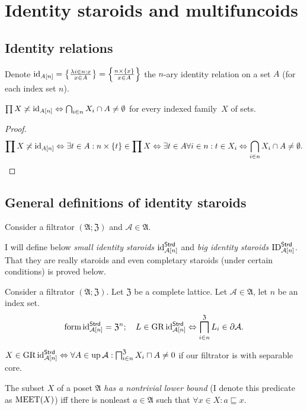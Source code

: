 \section{Identity staroids and multifuncoids}


\subsection{Identity relations}

Denote $\operatorname{id}_{A[n]}=\left\{ \frac{\lambda i\in n:x}{x\in A}\right\}=\left\{ \frac{n\times\{x\}}{x\in A}\right\}$
the $n$-ary identity relation on a set $A$ (for each index set $n$).
\begin{prop}
$\prod X\not\asymp\operatorname{id}_{A[n]}\Leftrightarrow\bigcap_{i\in n}X_{i}\cap A\neq\emptyset$
for every indexed family~$X$ of sets.\end{prop}
\begin{proof}
~
\[
\prod X\not\asymp\operatorname{id}_{A[n]}\Leftrightarrow\exists t\in A:n\times\{t\}\in\prod X\Leftrightarrow\exists t\in A\forall i\in n:t\in X_{i}\Leftrightarrow\bigcap_{i\in n}X_{i}\cap A\neq\emptyset.
\]

\end{proof}

\subsection{General definitions of identity staroids}

Consider a filtrator $(\mathfrak{A};\mathfrak{Z})$ and $\mathcal{A}\in\mathfrak{A}$.

I will define below \emph{small identity staroids} $\operatorname{id}_{\mathcal{A}[n]}^{\mathsf{Strd}}$
and \emph{big identity staroids} $\operatorname{ID}_{\mathcal{A}[n]}^{\mathsf{Strd}}$.
That they are really staroids and even completary staroids (under
certain conditions) is proved below.
\begin{defn}
Consider a filtrator $(\mathfrak{A};\mathfrak{Z})$.
Let $\mathfrak{Z}$ be a complete lattice. Let $\mathcal{A}\in\mathfrak{A}$,
let $n$ be an index set.
\[
\operatorname{form}\operatorname{id}_{\mathcal{A}[n]}^{\mathsf{Strd}}=\mathfrak{Z}^{n};\quad L\in\operatorname{GR}\operatorname{id}_{\mathcal{A}[n]}^{\mathsf{Strd}}\Leftrightarrow\bigsqcap_{i\in n}^{\mathfrak{Z}}L_{i}\in\partial\mathcal{A}.
\]
\end{defn}
\begin{obvious}
$X\in\operatorname{GR}\operatorname{id}_{\mathcal{A}[n]}^{\mathsf{Strd}}\Leftrightarrow\forall A\in\operatorname{up}\mathcal{A}:\bigsqcap_{i\in n}^{\mathfrak{Z}}X_{i}\sqcap A\neq0$
if our filtrator is with separable core.\end{obvious}
\begin{defn}
The subset $X$ of a poset $\mathfrak{A}$
\emph{has a nontrivial lower bound} (I denote this predicate as $\operatorname{MEET}(X)$)
iff there is nonleast $a\in\mathfrak{A}$ such that $\forall x\in X:a\sqsubseteq x$.
\end{defn}

